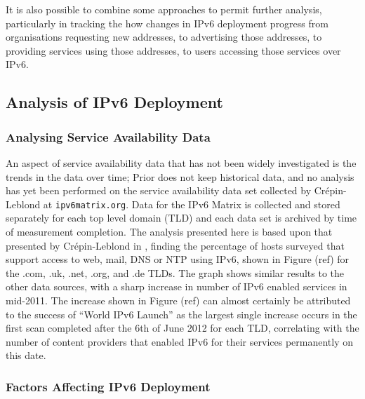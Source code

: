 It is also possible to combine some approaches to permit further analysis,
particularly in tracking the how changes in IPv6 deployment progress from
organisations requesting new addresses, to advertising those addresses, to
providing services using those addresses, to users accessing those
services over IPv6.

\subsection{Analysis of IPv6 Deployment}

\subsubsection{Analysing Service Availability Data}

An aspect of service availability data that has not been widely investigated is
the trends in the data over time; Prior does not keep historical data, and no
analysis has yet been performed on the service availability data set collected
by Crépin-Leblond at \verb+ipv6matrix.org+. Data for the IPv6 Matrix is
collected and stored separately for each top level domain (TLD) and each data set
is archived by time of measurement completion. The analysis presented here is
based upon that presented by Crépin-Leblond in
\cite{olivier_mj_crepin-leblond_ipv6_2011}, finding the percentage of hosts
surveyed that support access to web, mail, DNS or NTP using IPv6, shown in
Figure (ref) for the .com, .uk, .net, .org, and .de TLDs. The graph shows
similar results to the other data sources, with a sharp increase in number of
IPv6 enabled services in mid-2011. The increase shown in Figure (ref) can almost
certainly be attributed to the success of ``World IPv6 Launch'' as the largest
single increase occurs in the first scan completed after the 6th of June 2012
for each TLD, correlating with the number of content providers that enabled IPv6
for their services permanently on this date.

\subsubsection{Factors Affecting IPv6 Deployment}

